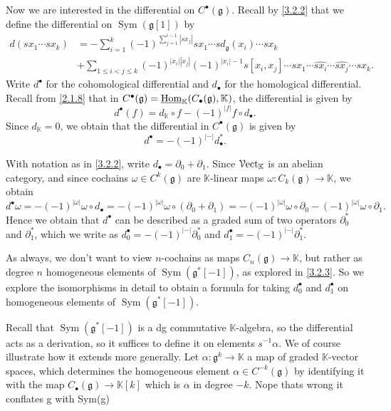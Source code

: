 \begin{discussion}\label{3.2.4}
	Now we are interested in the differential on $C^{\bullet} (\mathfrak{g} )$. Recall by \cref{3.2.2} that we define the differential on $\operatorname{Sym} (\mathfrak{g} [1])$ by
	\begin{align*}
		d(sx_1\cdots sx_k) &= -\sum_{i=1}^{k} (-1)^{\sum_{j=1}^{i-1} \left| sx_j \right| } sx_1 \cdots sd_\mathfrak{g}(x_i)\cdots sx_k\\
				   &+\sum_{1\leq i<j\leq k} (-1)^{\left| x_i \right| \left| x_j \right| } (-1)^{\left| x_i \right| -1} s[x_i,x_j]\cdots sx_1 \cdots \widehat{sx_i}\cdots \widehat{sx_j}\cdots sx_k
	.\end{align*}
	Write $d^{\bullet} $ for the cohomological differential and $d_{\bullet} $ for the homological differential. Recall from \cref{2.1.8} that in $C^{\bullet} (\mathfrak{g} )=\underline{\operatorname{Hom}}_\mathbb{K} (C_{\bullet} (\mathfrak{g} ),\mathbb{K} )$, the differential is given by
	\[
		d^{\bullet}(f)=d_\mathbb{K} \circ f - (-1)^{\left| f \right| } f\circ d_{\bullet} 
	.\]
	Since $d_\mathbb{K} =0$, we obtain that the differential in $C^{\bullet} (\mathfrak{g} )$ is given by
	\[
		d^{\bullet} =-(-1)^{\left| - \right| } d_{\bullet} ^*
	.\]
	

	With notation as in \cref{3.2.2}, write $d_{\bullet} =\partial _0 + \partial _1$. Since $\mathcal{V}\mathrm{ect}_\mathbb{K} $ is an abelian category, and since cochains $\omega \in C^k(\mathfrak{g} )$ are $\mathbb{K} $-linear maps $\omega : C_k(\mathfrak{g} ) \to \mathbb{K} $, we obtain
	\[
		d^{\bullet} \omega =-(-1)^{\left| \omega  \right| }\omega \circ d_{\bullet} =-(-1)^{\left| \omega  \right| } \omega \circ (\partial _0 + \partial _1) = -(-1)^{\left| \omega  \right| }\omega \circ \partial _0 -(-1)^{\left| \omega  \right| } \omega \circ \partial _1
	.\]
	Hence we obtain that $d^{\bullet} $ can be described as a graded sum of two operators $\partial _0^*$ and $\partial _1^*$, which we write as $d_0^{\bullet} =-(-1)^{\left| - \right| } \partial _0^*$ and $d_1^{\bullet} =-(-1)^{\left| - \right| } \partial _1^*$.

	As always, we don't want to view $n$-cochains as maps $C_n(\mathfrak{g} )\to \mathbb{K} $, but rather as degree $n$ homogeneous elements of $\operatorname{Sym} (\mathfrak{g} ^*[-1])$, as explored in \cref{3.2.3}. So we explore the isomorphisms in detail to obtain a formula for taking $d^{\bullet} _0$ and $d^{\bullet} _1$ on homogeneous elements of $\operatorname{Sym} (\mathfrak{g} ^*[-1])$.

	Recall that $\operatorname{Sym} (\mathfrak{g}^*[-1])$ is a dg commutative $\mathbb{K} $-algebra, so the differential acts as a derivation, so it suffices to define it on elements $s ^{-1} \alpha $. We of course illustrate how it extends more generally. Let $\alpha : \mathfrak{g}^k \to \mathbb{K} $ a map of graded $\mathbb{K} $-vector spaces, which determines the homogeneous element $\alpha \in C^{-k} (\mathfrak{g} )$ by identifying it with the map $C_{\bullet} (\mathfrak{g} )\to \mathbb{K} [k]$ which is $\alpha $ in degree $-k$. Nope thats wrong it conflates g with Sym(g)
\end{discussion}
